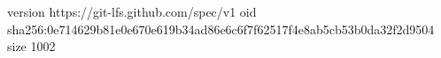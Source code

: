 version https://git-lfs.github.com/spec/v1
oid sha256:0e714629b81e0e670e619b34ad86e6c6f7f62517f4e8ab5cb53b0da32f2d9504
size 1002
